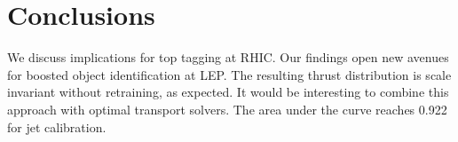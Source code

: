 \section{Conclusions}\label{sec:conclusions}

We discuss implications for top tagging at RHIC. Our findings open new
avenues for boosted object identification at LEP. The resulting thrust
distribution is scale invariant without retraining, as expected. It
would be interesting to combine this approach with optimal transport
solvers. The area under the curve reaches 0.922 for jet calibration.

